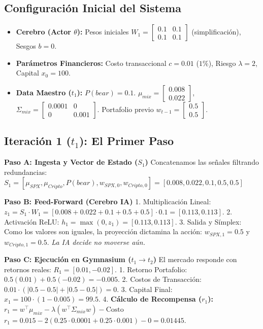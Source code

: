 \documentclass[11pt,a4paper]{article}
\begin{document}
\subsection{Configuración Inicial del Sistema}
\begin{itemize}
    \item \textbf{Cerebro (Actor $\theta$):} Pesos iniciales $W_1 = \begin{bmatrix} 0.1 & 0.1 \\ 0.1 & 0.1 \end{bmatrix}$ (simplificación), Sesgos $b=0$.
    \item \textbf{Parámetros Financieros:} Costo transaccional $c=0.01$ ($1\%$), Riesgo $\lambda = 2$, Capital $x_0 = 100$.
    \item \textbf{Data Maestro ($t_1$):} $P(bear)=0.1$. $\mu_{mix} = \begin{bmatrix} 0.008 \\ 0.022 \end{bmatrix}$, $\Sigma_{mix} = \begin{bmatrix} 0.0001 & 0 \\ 0 & 0.001 \end{bmatrix}$. Portafolio previo $w_{t-1} = \begin{bmatrix} 0.5 \\ 0.5 \end{bmatrix}$.
\end{itemize}

\subsection{Iteración 1 ($t_1$): El Primer Paso}

\textbf{Paso A: Ingesta y Vector de Estado ($S_1$)}
Concatenamos las señales filtrando redundancias:
$S_1 = [ \mu_{SPX}, \mu_{Cripto}, P(bear), w_{SPX,0}, w_{Cripto,0} ] = [0.008, 0.022, 0.1, 0.5, 0.5]$

\textbf{Paso B: Feed-Forward (Cerebro IA)}
1. Multiplicación Lineal: $z_1 = S_1 \cdot W_1 = [0.008+0.022+0.1+0.5+0.5] \cdot 0.1 = [0.113, 0.113]$.
2. Activación ReLU: $h_1 = \max(0, z_1) = [0.113, 0.113]$.
3. Salida y Símplex: Como los valores son iguales, la proyección dictamina la acción:
   $w_{SPX, 1} = 0.5$ y $w_{Cripto, 1} = 0.5$. \textit{La IA decide no moverse aún.}

\textbf{Paso C: Ejecución en Gymnasium ($t_1 \rightarrow t_2$)}
El mercado responde con retornos reales: $R_1 = [0.01, -0.02]$. 
1. Retorno Portafolio: $0.5(0.01) + 0.5(-0.02) = -0.005$.
2. Costos de Transacción: $0.01 \cdot (|0.5 - 0.5| + |0.5 - 0.5|) = 0$.
3. Capital Final: $x_1 = 100 \cdot (1 - 0.005) = 99.5$.
4. \textbf{Cálculo de Recompensa ($r_1$):}
   $r_1 = w^\top \mu_{mix} - \lambda (w^\top \Sigma_{mix} w) - \text{Costo}$
   $r_1 = 0.015 - 2(0.25 \cdot 0.0001 + 0.25 \cdot 0.001) - 0 = 0.01445$.
\end{document}
